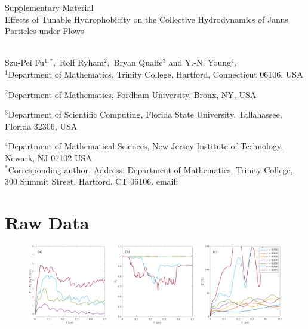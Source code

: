 
\thispagestyle{empty}

\newpage
{\Large \bf

  \noindent Supplementary Material\\

  \noindent 
 Effects of Tunable Hydrophobicity on the Collective Hydrodynamics of Janus Particles under Flows}\\

\noindent 
Szu-Pei Fu$^{1,*},$ 
Rolf Ryham$^{2},$ 
Bryan Quaife$^{3}$ and Y.-N. Young$^{4},$
\\

\noindent
$^{1}$Department of Mathematics, Trinity College, Hartford, Connecticut 06106, USA

\noindent
$^{2}$Department of Mathematics, Fordham University, Bronx, NY, USA

\noindent
$^{3}$Department of Scientific Computing, Florida State University, Tallahassee, Florida 32306, USA

\noindent
$^{4}$Department of Mathematical Sciences, New Jersey Institute of Technology, Newark, NJ 07102 USA
\\

\noindent $^*$Corresponding author. Address: Department of Mathematics, Trinity College, 
300 Summit Street, Hartford, CT 06106. email: 



\setcounter{page}{1}

\setcounter{figure}{0}
\renewcommand{\thefigure}{S\arabic{figure}}

\setcounter{equation}{0}
\renewcommand{\theequation}{S\arabic{equation}}

\setcounter{section}{0}
\renewcommand{\thesection}{S\arabic{section}} 




\section{Raw Data}




\begin{figure}[h!]
\begin{center}
\includegraphics[width=\textwidth]{SMFigures/VeShRaw.pdf}
\end{center}
\caption{}
\label{fig:veshraw}
\end{figure}


